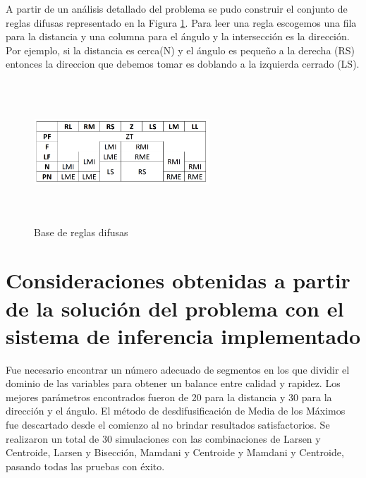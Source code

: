 \documentclass[a4paper,10pt]{article}
\begin{document}
		A partir de un análisis detallado del problema se pudo construir el conjunto de reglas difusas representado en la Figura \ref{fig:rules}.
	Para leer una regla escogemos una fila para la distancia y una columna para el ángulo y la intersección es la dirección. Por ejemplo, si la distancia es cerca(N) y el ángulo 		es pequeño a la derecha (RS) entonces la direccion que debemos tomar es doblando a la izquierda cerrado (LS). 
	
	\begin{figure}[!h]
		\begin{center}
			\includegraphics[width=250px, height=200px]{images/rules.jpg}
		\end{center}
		\caption{Base de reglas difusas \label{fig:rules}}
	\end{figure}
	
	
\section{Consideraciones obtenidas a partir de la solución del problema con el sistema de inferencia implementado}\label{sec:4}	

	Fue necesario encontrar un número adecuado de segmentos en los que dividir el dominio de las variables para obtener un balance entre calidad y rapidez. Los mejores parámetros encontrados fueron de 20 para la distancia y 30 para la dirección y el ángulo. El método de desdifusificación de Media de los Máximos fue descartado desde el comienzo al no brindar resultados satisfactorios. Se realizaron un total de 30 simulaciones con las combinaciones de Larsen y Centroide, Larsen y Bisección, Mamdani y Centroide y Mamdani y Centroide, pasando todas las pruebas con éxito.
\end{document}
